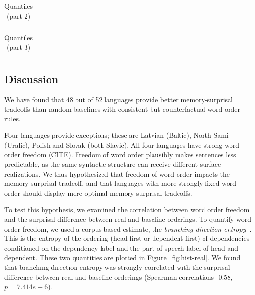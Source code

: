 \documentclass[11pt,letterpaper]{article}
\begin{document}
\begin{table}
\begin{longtable}{cccccccccccccccccc}

\end{longtable}
	\caption{Quantiles (part 2)}
\end{table}

\begin{table}
\begin{longtable}{cccccccccccccccccc}

\end{longtable}
	\caption{Quantiles (part 3)}
\end{table}







\subsection{Discussion}

We have found that 48 out of 52 languages provide better memory-surprisal tradeoffs than random baselines with consistent but counterfactual word order rules.

Four languages provide exceptions; these are Latvian (Baltic), North Sami (Uralic), Polish and Slovak (both Slavic).
All four languages have strong word order freedom (CITE).
Freedom of word order plausibly makes sentences less predictable, as the same syntactic structure can receive different surface realizations.
We thus hypothesized that freedom of word order impacts the memory-surprisal tradeoff, and that languages with more strongly fixed word order should display more optimal memory-surprisal tradeoffs.

To test this hypothesis, we examined the correlation between word order freedom and the surprisal difference between real and baseline orderings.
To quantify word order freedom, we used a corpus-based estimate, the \emph{branching direction entropy}~\citep{futrell-quantifying-2015}.
This is the entropy of the ordering (head-first or dependent-first) of dependencies conditioned on the dependency label and the part-of-speech label of head and dependent.
These two quantities are plotted in Figure~\ref{fig:hist-real}.
We found that branching direction entropy was strongly correlated with the surprisal difference between real and baseline orderings (Spearman correlations -0.58, $p = 7.414e-6$).
\end{document}
